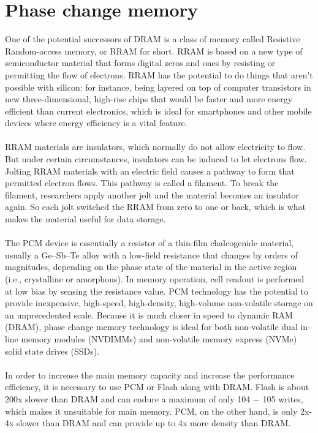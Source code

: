 \documentclass[11pt, conference, onecolumn]{IEEEtran}
\begin{document}
\section{Phase change memory}
One of the potential successors of DRAM is a class of memory called Resistive Random-access memory, or RRAM for short. RRAM is based on a new type of semiconductor material that forms digital zeros and ones by resisting or permitting the flow of electrons. RRAM has the potential to do things that aren’t possible with silicon: for instance, being layered on top of computer transistors in new three-dimensional, high-rise chips that would be faster and more energy efficient than current electronics, which is ideal for smartphones and other mobile devices where energy efficiency is a vital feature.\\
\\RRAM materials are insulators, which normally do not allow electricity to flow. But under certain circumstances, insulators can be induced to let electrons flow. Jolting RRAM materials with an electric field causes a pathway to form that permitted electron flows. This pathway is called a filament. To break the filament, researchers apply another jolt and the material becomes an insulator again. So each jolt switched the RRAM from zero to one or back, which is what makes the material useful for data storage.\\
\\The PCM device is essentially a resistor of a thin-film chalcogenide material, usually a Ge–Sb–Te alloy with a low-field resistance that changes by orders of magnitudes, depending on the phase state of the material in the active region (i.e., crystalline or amorphous). In memory operation, cell readout is performed at low bias by sensing the resistance value. PCM technology has the potential to provide inexpensive, high-speed, high-density, high-volume non-volatile storage on an unprecedented scale. Because it is much closer in speed to dynamic RAM (DRAM), phase change memory technology is ideal for both non-volatile dual in-line memory modules (NVDIMMs) and non-volatile memory express (NVMe) solid state drives (SSDs).\\
\\In order to increase the main memory capacity and increase the performance efficiency, it is necessary to use PCM or Flash along with DRAM. Flash is about 200x slower than DRAM and can endure a maximum of only 104 − 105 writes, which makes it unsuitable for main memory. PCM, on the other hand, is only 2x-4x slower than DRAM and can provide up to 4x more density than DRAM.\cite{b2}
\\
\\
\end{document}
